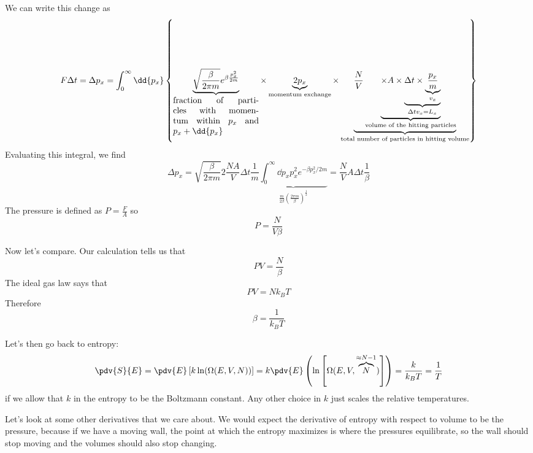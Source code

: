 \documentclass[a4paper,twoside,master.tex]{subfiles}
\begin{document}
We can write this change as
\begin{equation}
    F \Delta t = \Delta p_x = \int_0^{\infty} \dd{p_x} \left\{\underbrace{\sqrt{\frac{\beta}{2 \pi m}} e^{\beta \frac{p_x^2}{2m}}}_{\parbox{10em}{fraction of particles with momentum within $ p_x $ and $ p_x + \dd{p_x}$}} \times \underbrace{2 p_x}_{\text{momentum exchange}} \times \underbrace{\frac{N}{V} \underbrace{\times A \times \underbrace{\Delta t \times \underbrace{\frac{p_x}{m}}_{v_x}}_{\Delta t v_x = L_x}}_{\text{volume of the hitting particles}}}_{\text{total number of particles in hitting volume}}\right\}
\end{equation}
Evaluating this integral, we find
\begin{equation}
    \Delta p_x = \sqrt{\frac{\beta}{2 \pi m}} 2 \frac{NA}{V} \Delta t \frac{1}{m} \underbrace{\int_0^{\infty} \dd{p_x} p_x^2 e^{- \beta p_x^2 / 2m}}_{\frac{m}{2 \beta} \left( \frac{2 \pi m}{\beta} \right)^{\frac{1}{2}}} = \frac{N}{V} A \Delta t \frac{1}{\beta}
\end{equation}
The pressure is defined as $ P = \frac{F}{A} $ so
\begin{equation}
    P = \frac{N}{V \beta}
\end{equation}

Now let's compare. Our calculation tells us that
\begin{equation}
    PV = \frac{N}{\beta}
\end{equation}
The ideal gas law says that
\begin{equation}
    PV = N k_B T
\end{equation}
Therefore
\begin{equation}
    \beta = \frac{1}{k_B T}
\end{equation}

Let's then go back to entropy:
\begin{equation}
    \pdv{S}{E} = \pdv{E}\left[ k \ln(\Omega(E,V,N)) \right] = k \pdv{E} \left( \ln\left[ \Omega(E, V, \overbrace{N}^{\approx N-1}) \right] \right) = \frac{k}{k_B T} = \frac{1}{T}
\end{equation}
if we allow that $ k $ in the entropy to be the Boltzmann constant. Any other choice in $ k $ just scales the relative temperatures.

Let's look at some other derivatives that we care about. We would expect the derivative of entropy with respect to volume to be the pressure, because if we have a moving wall, the point at which the entropy maximizes is where the pressures equilibrate, so the wall should stop moving and the volumes should also stop changing.
\end{document}
